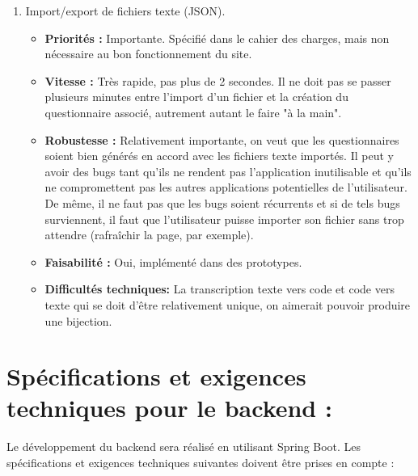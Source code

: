 \documentclass{article}
\begin{document}
\begin{enumerate}[noitemsep]
\begin{itemize}[noitemsep]
\end{itemize}
\item Import/export de fichiers texte (JSON).
\begin{itemize}[noitemsep]
    \item \textbf{Priorités : }Importante. Spécifié dans le cahier des charges, mais non nécessaire au bon fonctionnement du site.
    \item \textbf{Vitesse : }Très rapide, pas plus de 2 secondes. Il ne doit pas se passer plusieurs minutes entre l'import d'un fichier et la création du questionnaire associé, autrement autant le faire "à la main".
    \item \textbf{Robustesse : }Relativement importante, on veut que les questionnaires soient bien générés en accord avec les fichiers texte importés. Il peut y avoir des bugs tant qu'ils ne rendent pas l'application inutilisable et qu'ils ne compromettent pas les autres applications potentielles de l'utilisateur. De même, il ne faut pas que les bugs soient récurrents et si de tels bugs surviennent, il faut que l'utilisateur puisse importer son fichier sans trop attendre (rafraîchir la page, par exemple).
    \item \textbf{Faisabilité : }Oui, implémenté dans des prototypes.
    \item \textbf{Difficultés techniques: } La transcription texte vers code et code vers texte qui se doit d'être relativement unique, on aimerait pouvoir produire une bijection.
\end{itemize}
\end{enumerate}


\section{Spécifications et exigences techniques pour le backend :}

Le développement du backend sera réalisé en utilisant Spring Boot. Les spécifications et exigences techniques suivantes doivent être prises en compte :
\end{document}
